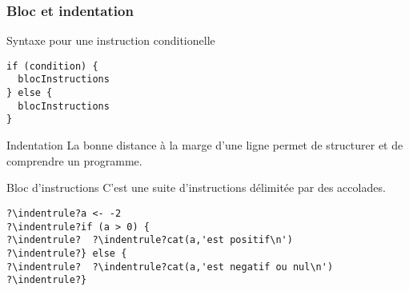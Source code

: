 \documentclass[10pt]{beamer}
\begin{document}
\begin{frame}[fragile]
  \frametitle{Bloc et indentation}
  \begin{alertblock}{Syntaxe pour une instruction conditionelle}
    \begin{lstlisting}[style=edblock]
if (condition) {
  blocInstructions
} else {
  blocInstructions
}
\end{lstlisting}
\end{alertblock}

\begin{block}{Indentation}
  La bonne distance à la marge d'une ligne permet de structurer et de comprendre un programme.
\end{block}

\begin{block}{Bloc d'instructions}
  C'est une suite d'instructions délimitée par des accolades.
\end{block}

  \newcommand{\indentrule}{\color{BrickRed}\vrule width 1pt\hspace{2pt}}
  \begin{lstlisting}[style=editor, escapechar=?]
?\indentrule?a <- -2
?\indentrule?if (a > 0) {
?\indentrule?  ?\indentrule?cat(a,'est positif\n')
?\indentrule?} else {
?\indentrule?  ?\indentrule?cat(a,'est negatif ou nul\n')
?\indentrule?}
\end{lstlisting}

\end{frame}
\end{document}
